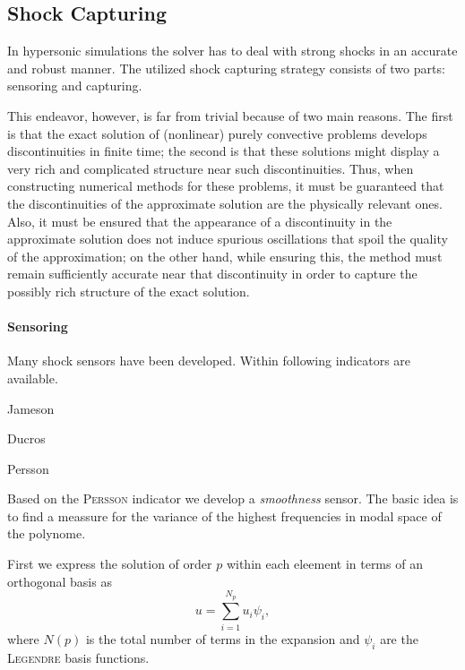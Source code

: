 \subsection{Shock Capturing}
\label{sec:shock-capturing}
In hypersonic simulations the solver has to deal with strong shocks in an
accurate and robust manner. The utilized shock capturing strategy consists of
two parts: sensoring and capturing.

This endeavor, however, is far from trivial because of two main reasons.
The first is that the exact solution of (nonlinear) purely convective problems
develops discontinuities in finite time; the second is that these solutions might
display a very rich and complicated structure near such discontinuities. Thus,
when constructing numerical methods for these problems, it must be 
guaranteed that the discontinuities of the approximate solution are the physically
relevant ones. Also, it must be ensured that the appearance of a discontinuity
in the approximate solution does not induce spurious oscillations that spoil
the quality of the approximation; on the other hand, while ensuring this, the
method must remain sufficiently accurate near that discontinuity in order to
capture the possibly rich structure of the exact solution.

\paragraph{Sensoring}
Many shock sensors have been developed. Within \FLEXI following indicators
are available.

\begin{description}
    \item[Jameson]\cite{jameson1981}
    \item[Ducros] \cite{ducros1999}
    \item[Persson] \cite{persson2006}
\end{description}

Based on the \textsc{Persson} indicator we develop a \emph{smoothness} sensor.
The basic idea is to find a meassure for the variance of the highest
frequencies in modal space of the polynome.

First we express the solution of order $p$ within each eleement in terms of
an orthogonal basis as
\begin{equation}
    u = \sum^{N_p}_{i=1} u_i \psi_i,
\end{equation}
where $N(p)$ is the total number of terms in the expansion and $\psi_i$ are the
\textsc{Legendre} basis functions.

